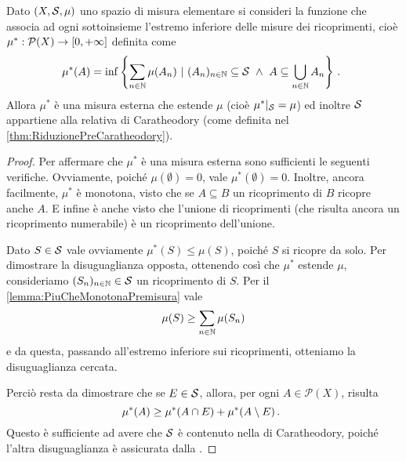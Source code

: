 \begin{proposition}\label{prop:MisuraEsternaDiPremisura}
	Dato $(X,\S,\mu)$ uno spazio di misura elementare si consideri la funzione che associa ad ogni sottoinsieme l'estremo inferiore delle misure dei ricoprimenti, cioè $\mu^*:\mathcal P(X)\to\Rpiu$ definita come 
	\begin{equation*}
		\mu^*(A)=\inf\left\{\sum_{n\in\N} \mu(A_n)\ |\ (A_n)_{n\in\N}\subseteq\S\ \wedge
		\ A\subseteq\bigcup_{n\in\N}A_n\right\} \punto
	\end{equation*}
	Allora $\mu^*$ è una misura esterna che estende $\mu$ (cioè $\mu^*|_\S=\mu$) ed inoltre $\S$ appartiene alla relativa \sigalg{} di Caratheodory (come definita nel \cref{thm:RiduzionePreCaratheodory}).
\end{proposition}
\begin{proof}
	Per affermare che $\mu^*$ è una misura esterna sono sufficienti le seguenti verifiche.
	Ovviamente, poiché $\mu(\emptyset)=0$, vale $\mu^*(\emptyset)=0$. 
	Inoltre, ancora facilmente, $\mu^*$ è monotona, visto che se $A\subseteq B$ un ricoprimento di $B$ ricopre anche $A$.
	E infine è anche \sigsubadd{} visto che l'unione di ricoprimenti (che risulta ancora un ricoprimento numerabile) è un ricoprimento dell'unione.
	
	Dato $S\in\S$ vale ovviamente $\mu^*(S)\le\mu(S)$, poiché $S$ si ricopre da solo. Per dimostrare la disuguaglianza opposta, ottenendo così che $\mu^*$ estende $\mu$, consideriamo $(S_n)_{n\in\N}\in \S$ un ricoprimento di $S$. Per il \cref{lemma:PiuCheMonotonaPremisura} vale
	\begin{equation*}
		\mu(S)\ge \sum_{n\in\N} \mu(S_n)
	\end{equation*}
	e da questa, passando all'estremo inferiore sui ricoprimenti, otteniamo la disuguaglianza cercata.
	
	Perciò resta da dimostrare che se $E\in \S$, allora, per ogni $A\in\mathcal P(X)$, risulta
	\begin{equation}\label{eq:MisuraEsternaDisDifficile}
		\mu^*(A) \ge \mu^*(A\cap E)+\mu^*(A\setminus E) \punto
	\end{equation}
	Questo è sufficiente ad avere che $\S$ è contenuto nella \sigalg{} di Caratheodory, poiché l'altra disuguaglianza è assicurata dalla \sigsubadd[ità].
	

\end{proof}
